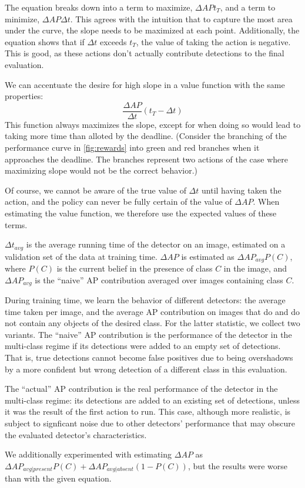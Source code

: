 The equation breaks down into a term to maximize, $\Delta AP t_T$, and a term to minimize, $\Delta AP \Delta t$.
This agrees with the intuition that to capture the most area under the curve, the slope needs to be maximized at each point.
Additionally, the equation shows that if $\Delta t$ exceeds $t_T$, the value of taking the action is negative.
This is good, as these actions don't actually contribute detections to the final evaluation.

We can accentuate the desire for high slope in a value function with the same properties:
\begin{equation}\label{eq:slope}
\frac{\Delta AP}{\Delta t} (t_T - \Delta t)
\end{equation}
This function always maximizes the slope, except for when doing so would lead to taking more time than alloted by the deadline.
(Consider the branching of the performance curve in \ref{fig:rewards} into green and red branches when it approaches the deadline.
The branches represent two actions of the case where maximizing slope would not be the correct behavior.)

Of course, we cannot be aware of the true value of $\Delta t$ until having taken the action, and the policy can never be fully certain of the value of $\Delta AP$.
When estimating the value function, we therefore use the expected values of these terms.

$\Delta t_{avg}$ is the average running time of the detector on an image, estimated on a validation set of the data at training time.
$\Delta AP$ is estimated as $\Delta AP_{avg} P(C)$, where $P(C)$ is the current belief in the presence of class $C$ in the image, and $\Delta AP_{avg}$ is the ``naive'' AP contribution averaged over images containing class $C$.

During training time, we learn the behavior of different detectors: the average time taken per image, and the average AP contribution on images that do and do not contain any objects of the desired class.
For the latter statistic, we collect two variants.
The ``naive'' AP contribution is the performance of the detector in the multi-class regime if its detections were added to an empty set of detections.
That is, true detections cannot become false positives due to being overshadows by a more confident but wrong detection of a different class in this evaluation.

The ``actual'' AP contribution is the real performance of the detector in the multi-class regime: its detections are added to an existing set of detections, unless it was the result of the first action to run.
This case, although more realistic, is subject to signficant noise due to other detectors' performance that may obscure the evaluated detector's characteristics.


We additionally experimented with estimating $\Delta AP$ as $\Delta AP_{avg|present} P(C) + \Delta AP_{avg|absent} (1-P(C))$, but the results were worse than with the given equation.
